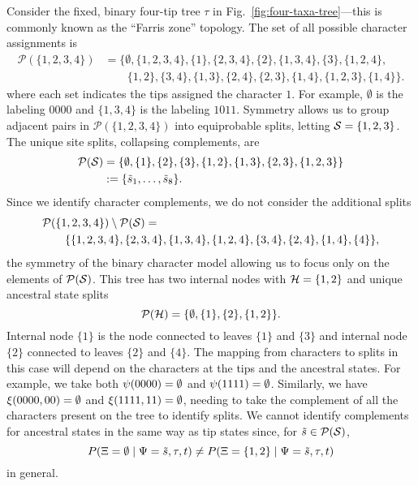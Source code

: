 Consider the fixed, binary four-tip tree $\tau$ in Fig.~\ref{fig:four-taxa-tree}---this is commonly known as the ``Farris zone'' topology.
The set of all possible character assignments is
\begin{align*}
\mathcal{P}(\{1,2,3,4\}) &= \{\emptyset, \{1,2,3,4\}, \{1\}, \{2,3,4\}, \{2\}, \{1,3,4\}, \{3\}, \{1,2,4\}, \\
                         &\qquad \{1,2\}, \{3,4\}, \{1,3\}, \{2,4\}, \{2,3\}, \{1,4\}, \{1,2,3\}, \{1,4\}\}.
\end{align*}
where each set indicates the tips assigned the character $1$.
For example, $\emptyset$ is the labeling $0000$ and $\{1,3,4\}$ is the labeling $1011$.
Symmetry allows us to group adjacent pairs in $\mathcal{P}(\{1,2,3,4\})$ into equiprobable splits, letting $\mathcal{S}=\{1,2,3\}$.
The unique site splits, collapsing complements, are
\begin{align*}
    \mathcal{P}(\mathcal{S}) &= \{\emptyset, \{1\}, \{2\}, \{3\}, \{1,2\}, \{1,3\}, \{2,3\}, \{1,2,3\}\} \\
& := \{\tilde{s}_1, \ldots, \tilde{s}_8\}.
\end{align*}
Since we identify character complements, we do not consider the additional splits
\begin{equation*}
\begin{split}
& \mathcal{P}(\{1,2,3,4\}) \setminus \mathcal{P}(\mathcal{S}) = \\
&\qquad \{\{1,2,3,4\}, \{2,3,4\}, \{1,3,4\}, \{1,2,4\}, \{3,4\}, \{2,4\}, \{1,4\}, \{4\}\},
\end{split}
\end{equation*}
the symmetry of the binary character model allowing us to focus only on the elements of $\mathcal{P}(\mathcal{S})$.
This tree has two internal nodes with $\mathcal{H}=\{1,2\}$ and unique ancestral state splits
$$
\mathcal{P}(\mathcal{H}) = \{\emptyset, \{1\}, \{2\}, \{1,2\}\}.
$$
Internal node $\{1\}$ is the node connected to leaves $\{1\}$ and $\{3\}$ and internal node $\{2\}$ connected to leaves $\{2\}$ and $\{4\}$.
The mapping from characters to splits in this case will depend on the characters at the tips and the ancestral states.
For example, we take both $\psi(0000)=\emptyset$ and $\psi(1111)=\emptyset$.
Similarly, we have $\xi(0000, 00) = \emptyset$ and $\xi(1111, 11)=\emptyset$, needing to take the complement of all the characters present on the tree to identify splits.
We cannot identify complements for ancestral states in the same way as tip states since, for $\tilde{s}\in\mathcal{P}(\mathcal{S})$,
$$
P(\Xi=\emptyset \mid \Psi=\tilde{s}, \tau, t)\neq P(\Xi=\{1,2\} \mid \Psi=\tilde{s}, \tau, t)
$$
in general.

